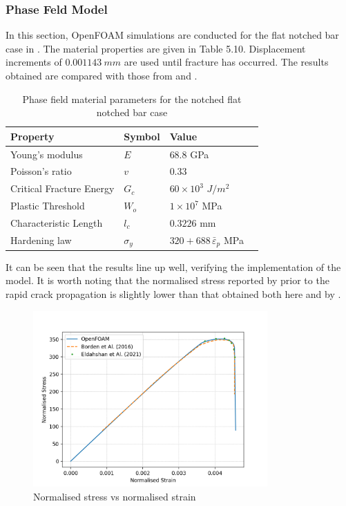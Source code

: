 \documentclass[sn-mathphys,Numbered,draft]{sn-jnl}%
\begin{document}
\subsubsection{Phase Feld Model}

In this section, OpenFOAM simulations are conducted for the flat notched bar case in \citet{borden_phase-field_2016}. The material properties are given in Table 5.10. Displacement increments of $0.001143\ mm$ are used until fracture has occurred. The results obtained are compared with those from \citet{borden_phase-field_2016} and \citet{eldahshan_phase_2021}. 

\begin{table}[htb]
	\centering
		\begin{tabular}{llll} \hline
			Property & Symbol & Value  \\ \hline 
			Young's modulus & $E$ & $68.8$ GPa \\
			Poisson's ratio & $v$ & $0.33$   \\
			Critical Fracture Energy & $G_c$ & $60\times10^3$ $J/m^2$ \\
			Plastic Threshold & $W_o$ & $1\times10^7$ MPa \\
			Characteristic Length & $l_c$ & $0.3226$ mm    \\
			Hardening law & $\sigma_y$ & $320+688\, {\bar{\varepsilon}}_p$ MPa  \\
			\hline
		\end{tabular}
	\caption{Phase field material parameters for the notched flat notched bar case}
	\label{table:FNB_material_properties_phaseField}
\end{table}


It can be seen that the results line up well, verifying the implementation of the model. It is worth noting that the normalised stress reported by \citet{borden_phase-field_2016} prior to the rapid crack propagation is slightly lower than that obtained both here and by \citet{eldahshan_phase_2021}.

\begin{figure}[htb]
\begin{center}
	\includegraphics[width=0.8\textwidth]{./Figures/phaseCompare.png}
\caption{Normalised stress vs normalised strain}
\label{fig:notchedRoundBAr}
\end{center}
\end{figure}
\end{document}
